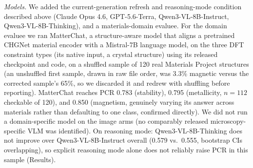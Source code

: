 \documentclass[pdflatex,sn-nature]{sn-jnl}
\begin{document}
\noindent\emph{Models.} We added the current-generation refresh and reasoning-mode
condition described above (Claude Opus 4.6, GPT-5.6-Terra, Qwen3-VL-8B-Instruct,
Qwen3-VL-8B-Thinking), and a materials-domain evaluee. For the domain evaluee we ran
MatterChat\cite{matterchat2026}, a structure-aware model that aligns a pretrained CHGNet
material encoder with a Mistral-7B language model, on the three DFT constraint types (its
native input, a crystal structure) using its released checkpoint and code, on a shuffled
sample of 120 real Materials Project structures (an unshuffled first sample, drawn in raw
file order, was 3.3\% magnetic versus the corrected sample's 65\%, so we discarded it and
redrew with shuffling before reporting). MatterChat reaches PCR 0.783 (stability), 0.795
(metallicity, $n=112$ checkable of 120), and 0.850 (magnetism, genuinely varying its answer
across materials rather than defaulting to one class, confirmed directly). We did not run a
domain-specific model on the image arms (no comparably released microscopy-specific VLM was
identified). On reasoning mode: Qwen3-VL-8B-Thinking does not improve over
Qwen3-VL-8B-Instruct overall (0.579 vs.\ 0.555, bootstrap CIs overlapping), so explicit
reasoning mode alone does not reliably raise PCR in this sample (Results).
\end{document}
